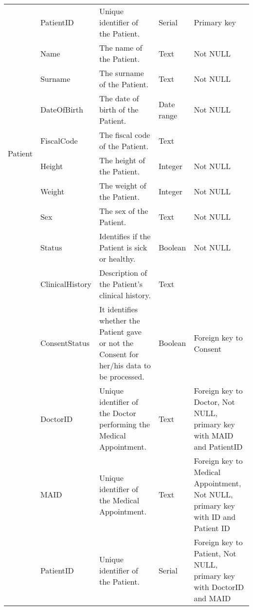 \begin{longtable}{|p{}|p{} |p{}|p{}|p{} |}
\multirow{10}{*}{Patient} 
&PatientID 
    &Unique identifier of the Patient.
    &Serial
    &Primary key
\\\cline{2-5}
&Name 
    &The name of the Patient.
    &Text
    &Not NULL
\\\cline{2-5}
&Surname 
    &The surname of the Patient.
    &Text
    &Not NULL
\\\cline{2-5}
&DateOfBirth 
    &The date of birth of the Patient.
    &Date range
    &Not NULL
\\\cline{2-5}
&FiscalCode
    &The fiscal code of the Patient.
    &Text
    &
\\\cline{2-5}
&Height 
    &The height of the Patient.
    &Integer
    &Not NULL
\\\cline{2-5}
&Weight 
    &The weight of the Patient.
    &Integer
    &Not NULL
\\\cline{2-5}
&Sex 
    &The sex of the Patient.
    &Text
    &Not NULL
\\\cline{2-5}
&Status 
    &Identifies if the Patient is sick or healthy.
    &Boolean
    &Not NULL
\\\cline{2-5}
&ClinicalHistory 
    &Description of the Patient's clinical history.
    &Text
    &
\\\cline{2-5}
&ConsentStatus 
    &It identifies whether the Patient gave or not the Consent for her/his data to be processed.
    &Boolean
    &Foreign key to Consent
\\\hline
\newpage
\hline
\multirow{3}{*}{Performs}
	& DoctorID 
		& Unique identifier of the Doctor performing the Medical Appointment. 
		& Text
		& Foreign key to Doctor, Not NULL, primary key with MAID and PatientID
\\\cline{2-5}
	& MAID 	
		& Unique identifier of the Medical Appointment. 
		& Text
		& Foreign key to Medical Appointment, Not NULL, primary key with ID and Patient ID
\\\cline{2-5}
    & PatientID 
    		& Unique identifier of the Patient. 
    		& Serial
    		& Foreign key to Patient, Not NULL, primary key with DoctorID and MAID
\\\hline


\end{longtable}
